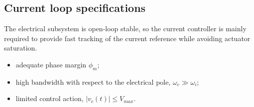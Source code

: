 \subsection{Current loop specifications}
The electrical subsystem is open-loop stable, so the current controller is mainly required to provide
fast tracking of the current reference while avoiding actuator saturation.
\begin{itemize}
    \item adequate phase margin $\phi_m$;
    \item high bandwidth with respect to the electrical pole, $\omega_c \gg \omega_i$;
    \item limited control action, $|v_c(t)| \leq V_{max}$.
\end{itemize}

